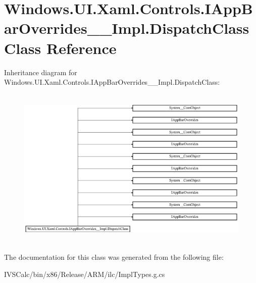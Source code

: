 \hypertarget{class_windows_1_1_u_i_1_1_xaml_1_1_controls_1_1_i_app_bar_overrides_____impl_1_1_dispatch_class}{}\section{Windows.\+U\+I.\+Xaml.\+Controls.\+I\+App\+Bar\+Overrides\+\_\+\+\_\+\+Impl.\+Dispatch\+Class Class Reference}
\label{class_windows_1_1_u_i_1_1_xaml_1_1_controls_1_1_i_app_bar_overrides_____impl_1_1_dispatch_class}
Inheritance diagram for Windows.\+U\+I.\+Xaml.\+Controls.\+I\+App\+Bar\+Overrides\+\_\+\+\_\+\+Impl.\+Dispatch\+Class\+:\begin{figure}[H]
\begin{center}
\leavevmode
\includegraphics[height=7.797468cm]{class_windows_1_1_u_i_1_1_xaml_1_1_controls_1_1_i_app_bar_overrides_____impl_1_1_dispatch_class}
\end{center}
\end{figure}


The documentation for this class was generated from the following file\+:\begin{DoxyCompactItemize}
\item 
I\+V\+S\+Calc/bin/x86/\+Release/\+A\+R\+M/ilc/Impl\+Types.\+g.\+cs\end{DoxyCompactItemize}
